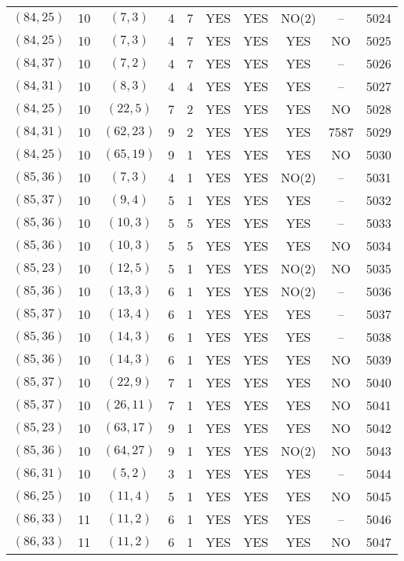 \begin{longtable}{|c|c|c|c|c|c|c|c|c|c|}
$(84, 25)$ & 10 & $(7, 3)$ & 4 & 7 & YES & YES & NO(2) & -- & 5024\\
$(84, 25)$ & 10 & $(7, 3)$ & 4 & 7 & YES & YES & YES & NO & 5025\\
$(84, 37)$ & 10 & $(7, 2)$ & 4 & 7 & YES & YES & YES & -- & 5026\\
$(84, 31)$ & 10 & $(8, 3)$ & 4 & 4 & YES & YES & YES & -- & 5027\\
$(84, 25)$ & 10 & $(22, 5)$ & 7 & 2 & YES & YES & YES & NO & 5028\\
$(84, 31)$ & 10 & $(62, 23)$ & 9 & 2 & YES & YES & YES & 7587 & 5029\\
$(84, 25)$ & 10 & $(65, 19)$ & 9 & 1 & YES & YES & YES & NO & 5030\\
$(85, 36)$ & 10 & $(7, 3)$ & 4 & 1 & YES & YES & NO(2) & -- & 5031\\
$(85, 37)$ & 10 & $(9, 4)$ & 5 & 1 & YES & YES & YES & -- & 5032\\
$(85, 36)$ & 10 & $(10, 3)$ & 5 & 5 & YES & YES & YES & -- & 5033\\
$(85, 36)$ & 10 & $(10, 3)$ & 5 & 5 & YES & YES & YES & NO & 5034\\
$(85, 23)$ & 10 & $(12, 5)$ & 5 & 1 & YES & YES & NO(2) & NO & 5035\\
$(85, 36)$ & 10 & $(13, 3)$ & 6 & 1 & YES & YES & NO(2) & -- & 5036\\
$(85, 37)$ & 10 & $(13, 4)$ & 6 & 1 & YES & YES & YES & -- & 5037\\
$(85, 36)$ & 10 & $(14, 3)$ & 6 & 1 & YES & YES & YES & -- & 5038\\
$(85, 36)$ & 10 & $(14, 3)$ & 6 & 1 & YES & YES & YES & NO & 5039\\
$(85, 37)$ & 10 & $(22, 9)$ & 7 & 1 & YES & YES & YES & NO & 5040\\
$(85, 37)$ & 10 & $(26, 11)$ & 7 & 1 & YES & YES & YES & NO & 5041\\
$(85, 23)$ & 10 & $(63, 17)$ & 9 & 1 & YES & YES & YES & NO & 5042\\
$(85, 36)$ & 10 & $(64, 27)$ & 9 & 1 & YES & YES & NO(2) & NO & 5043\\
$(86, 31)$ & 10 & $(5, 2)$ & 3 & 1 & YES & YES & YES & -- & 5044\\
$(86, 25)$ & 10 & $(11, 4)$ & 5 & 1 & YES & YES & YES & NO & 5045\\
$(86, 33)$ & 11 & $(11, 2)$ & 6 & 1 & YES & YES & YES & -- & 5046\\
$(86, 33)$ & 11 & $(11, 2)$ & 6 & 1 & YES & YES & YES & NO & 5047\\

\end{longtable}
